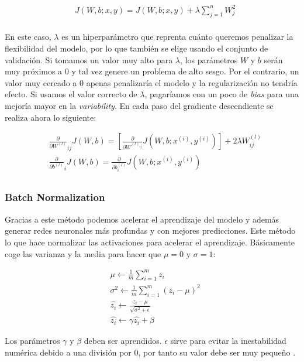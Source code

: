 \begin{align*}
	&J(W,b;x,y) = J(W,b;x,y) + \lambda \sum_{j=1}^n W_j^2\\
\end{align*}

En este caso, $\lambda$ es un hiperparámetro que reprenta cuánto queremos penalizar la flexibilidad del modelo, por lo que también se elige usando el conjunto de validación. Si tomamos un valor muy alto para $\lambda$, los parámetros $W$ y $b$ serán muy próximos a 0 y tal vez genere un problema de alto sesgo. Por el contrario, un valor muy cercado a 0 apenas penalizaría el modelo y la regularización no tendría efecto. Si usamos el valor correcto de $\lambda$, pagaríamos con un poco de \textit{bias} para una mejoría mayor en la \textit{variability}. En cada paso del gradiente descendiente se realiza ahora lo siguiente:

\begin{align*}
	&\frac{\partial}{\partial W^{(l)}}_{ij} J(W,b) = \left[ \frac{\partial}{\partial W^{(l)_{ij}}} J(W,b;x^{(i)},y^{(i)}) \right] + 2 \lambda W^{(l)}_{ij}\\
	&\frac{\partial}{\partial b^{(l)}}_i J(W,b) = \frac{\partial}{\partial b^{(l)}_i} J(W,b;x^{(i)},y^{(i)})\\
\end{align*}

\subsubsection{Batch Normalization}

Gracias a este método podemos acelerar el aprendizaje del modelo y además generar redes neuronales más profundas y con mejores predicciones. Este método lo que hace normalizar las activaciones para acelerar el aprendizaje. Básicamente coge las varianza y la media para hacer que $\mu = 0$ y $\sigma = 1$:

\begin{align}
	&\mu \leftarrow \frac{1}{m} \sum_{i=1}^m z_i\\
	&\sigma^2 \leftarrow \frac{1}{m} \sum_{i=1}^m (z_i - \mu)^2\\
	&\hat{z_i} \leftarrow \frac{z_i - \mu}{\sqrt{\sigma ^ 2 + \epsilon}}\\
	&\hat{z_i} \leftarrow \gamma \hat{z_i} + \beta 
\end{align}

Los parámetros $\gamma$ y $\beta$ deben ser aprendidos. $\epsilon$ sirve para evitar la inestabilidad numérica debido a una división por 0, por tanto su valor debe ser muy pequeño \cite{DBLP:journals/corr/IoffeS15}.

